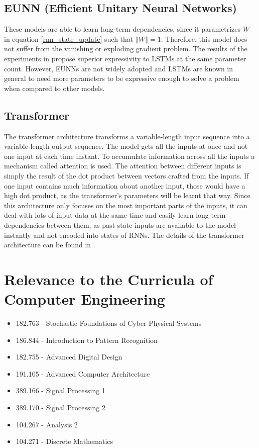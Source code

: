 \documentclass{article}
\begin{document}
    \subsection{EUNN (Efficient Unitary Neural Networks)}
    These models are able to learn long-term dependencies, since it parametrizes $W$ in equation \ref{rnn_state_update} such that $\left\Vert W \right\Vert = 1$.
    Therefore, this model does not suffer from the vanishing or exploding gradient problem. The results of the experiments in \cite{EfficientUnitaryRNNs} propose superior expressivity to LSTMs at the same parameter count.
    However, EUNNs are not widely adopted and LSTMs are known in general to need more parameters to be expressive enough to solve a problem when compared to other models.

    \subsection{Transformer}
    The transformer architecture transforms a variable-length input sequence into a variable-length output sequence.
    The model gets all the inputs at once and not one input at each time instant.
    To accumulate information across all the inputs a mechanism called attention is used.
    The attention between different inputs is simply the result of the dot product between vectors crafted from the inputs.
    If one input contains much information about another input, those would have a high dot product, as the transformer's parameters will be learnt that way.
    Since this architecture only focuses on the most important parts of the inputs, it can deal with lots of input data at the same time and easily learn long-term dependencies between them, as past state inputs are available to the model instantly and not encoded into states of RNNs.
    The details of the transformer architecture can be found in \cite{Transformer}.


    \section{Relevance to the Curricula of Computer Engineering}
    \begin{itemize}
        \item{182.763 - Stochastic Foundations of Cyber-Physical Systems}
        \item{186.844 - Introduction to Pattern Recognition}
        \item{182.755 - Advanced Digital Design}
        \item{191.105 - Advanced Computer Architecture}
        \item{389.166 - Signal Processing 1}
        \item{389.170 - Signal Processing 2}
        \item{104.267 - Analysis 2}
        \item{104.271 - Discrete Mathematics}
    \end{itemize}
    \printbibliography
\end{document}
